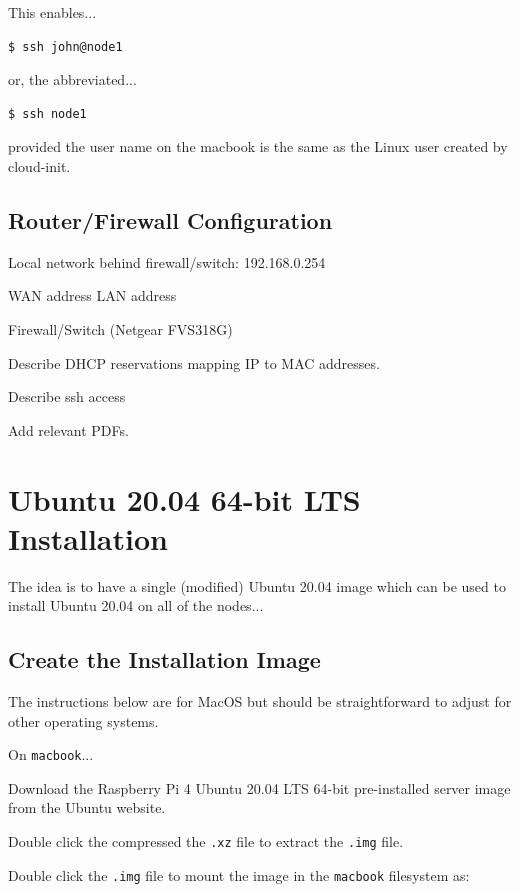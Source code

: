 \documentclass{report}
\begin{document}
This enables...

\lstset{style=termstyle}
\begin{lstlisting}[]
$ ssh john@node1
\end{lstlisting}

or, the abbreviated...

\lstset{style=termstyle}
\begin{lstlisting}[]
$ ssh node1
\end{lstlisting}

provided the user name on the macbook is the same as the Linux user created by cloud-init.



\subsection{Router/Firewall Configuration}

Local network behind firewall/switch: 192.168.0.254

WAN address
LAN address

Firewall/Switch (Netgear FVS318G)

Describe DHCP reservations mapping IP to MAC addresses.

Describe ssh access

Add relevant PDFs.


%
%
\clearpage\section{Ubuntu 20.04 64-bit LTS Installation}

The idea is to have a single (modified) Ubuntu 20.04 image which can be used to install Ubuntu 20.04 on all of the nodes...


%
%
\subsection{Create the Installation Image}

The instructions below are for MacOS but should be straightforward to adjust for other operating systems.

On \verb|macbook|...

Download the Raspberry Pi 4 Ubuntu 20.04 LTS 64-bit pre-installed server image from the Ubuntu website.

Double click the compressed the \verb|.xz| file to extract the \verb|.img| file. 

Double click the \verb|.img| file to mount the image in the \verb|macbook| filesystem as:
\end{document}
